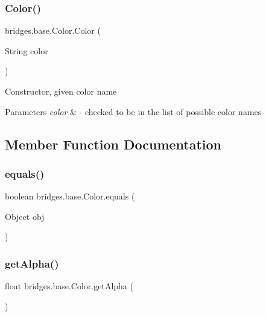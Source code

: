 \subsubsection{\texorpdfstring{Color()}{Color()}\hspace{0.1cm}{\footnotesize\ttfamily [4/4]}}
{\footnotesize\ttfamily bridges.\+base.\+Color.\+Color (\begin{DoxyParamCaption}\item[{String}]{color }\end{DoxyParamCaption})}

Constructor, given color name


\begin{DoxyParams}{Parameters}
{\em color} & -\/ checked to be in the list of possible color names \\
\hline
\end{DoxyParams}


\subsection{Member Function Documentation}
\mbox{\label{classbridges_1_1base_1_1_color_a81fb4cb13c05a3da2f29f48b07189e7c}} 
\subsubsection{\texorpdfstring{equals()}{equals()}}
{\footnotesize\ttfamily boolean bridges.\+base.\+Color.\+equals (\begin{DoxyParamCaption}\item[{Object}]{obj }\end{DoxyParamCaption})}

\mbox{\label{classbridges_1_1base_1_1_color_a7c4247e31ecd8fcc61ef208d5deefe68}} 
\subsubsection{\texorpdfstring{get\+Alpha()}{getAlpha()}}
{\footnotesize\ttfamily float bridges.\+base.\+Color.\+get\+Alpha (\begin{DoxyParamCaption}{ }\end{DoxyParamCaption})}

